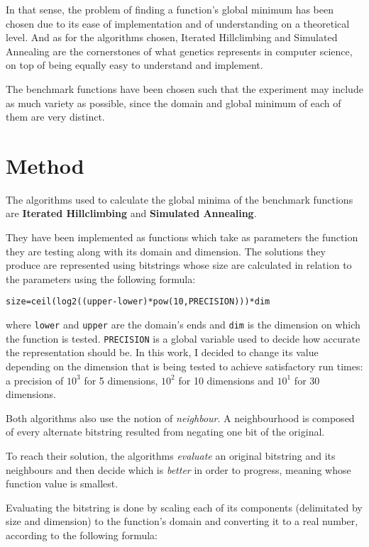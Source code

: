 \documentclass{article}
\begin{document}
In that sense, the problem of finding a function's global minimum has been chosen due to its ease of implementation and of understanding on a theoretical level.
And as for the algorithms chosen, Iterated Hillclimbing and Simulated Annealing are the cornerstones of what genetics represents in computer science, on top of being equally easy to understand and implement.

The benchmark functions have been chosen such that the experiment may include as much variety as possible, since the domain and global minimum of each of them are very distinct.

\section{Method}
The algorithms used to calculate the global minima of the benchmark functions are \textbf{Iterated Hillclimbing} and \textbf{Simulated Annealing}.
\vspace{5mm}

They have been implemented as functions which take as parameters the function they are testing along with its domain and dimension. The solutions they produce are represented using bitstrings whose size are calculated in relation to the parameters using the following formula:

\vspace{3mm}
\texttt{size=ceil(log2((upper-lower)*pow(10,PRECISION)))*dim}
\vspace{3mm}

where \texttt{lower} and \texttt{upper} are the domain's ends and \texttt{dim} is the dimension on which the function is tested.
\texttt{PRECISION} is a global variable used to decide how accurate the representation should be. In this work, I decided to change its value depending on the dimension that is being tested to achieve satisfactory run times:
a precision of $10^3$ for 5 dimensions, $10^2$ for 10 dimensions and $10^1$ for 30 dimensions.

Both algorithms also use the notion of \textsl{neighbour}. A neighbourhood is composed of every alternate bitstring resulted from negating one bit of the original.

To reach their solution, the algorithms \textsl{evaluate} an original bitstring and its neighbours and then decide which is \textsl{better} in order to progress, meaning whose function value is smallest.

Evaluating the bitstring is done by scaling each of its components (delimitated by size and dimension) to the function's domain and converting it to a real number, according to the following formula:
\end{document}
